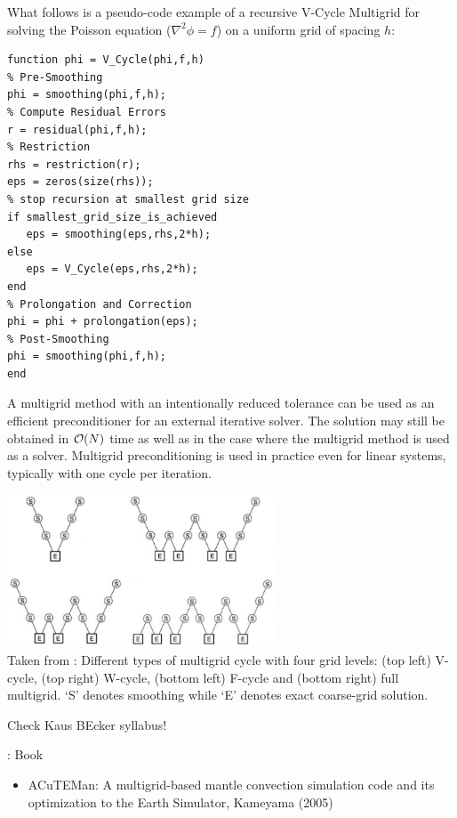 What follows is a pseudo-code example of a recursive V-Cycle Multigrid for solving 
the Poisson equation ($\nabla^2 \phi = f$) 
on a uniform grid of spacing $h$:

\begin{verbatim}
function phi = V_Cycle(phi,f,h)
% Pre-Smoothing
phi = smoothing(phi,f,h);
% Compute Residual Errors
r = residual(phi,f,h);
% Restriction
rhs = restriction(r);
eps = zeros(size(rhs));
% stop recursion at smallest grid size
if smallest_grid_size_is_achieved
   eps = smoothing(eps,rhs,2*h);
else        
   eps = V_Cycle(eps,rhs,2*h);        
end
% Prolongation and Correction
phi = phi + prolongation(eps);
% Post-Smoothing
phi = smoothing(phi,f,h);    
end
\end{verbatim}

A multigrid method with an intentionally reduced tolerance can be used as an efficient preconditioner for an external iterative solver. The solution may still be obtained in ${\cal O}(N)$ time as well as in the case where the multigrid method is used as a solver. Multigrid preconditioning is used in practice even for linear systems, typically with one cycle per iteration.

\begin{center}
\includegraphics[width=8cm]{images/multigrid/cycles}\\
{\scriptsize Taken from \cite{tack10}: Different types of multigrid cycle with four grid levels: (top left) V-cycle, (top right) W-cycle,
(bottom left) F-cycle and (bottom right) full multigrid. ‘S’ denotes smoothing while ‘E’ denotes
exact coarse-grid solution.}
\end{center} 

Check Kaus BEcker syllabus!

\Literature: \cite{pisa85,lils89,trha96,tack10,gery10,mabl15,lopp14,tros01,moma05,yaba00,weoo01,teeb18,yavn06,clhk19} Book \cite{brmc00}
\begin{itemize}
\item ACuTEMan: A multigrid-based mantle convection simulation code
and its optimization to the Earth Simulator, Kameyama (2005) \cite{kame05}
\end{itemize}

